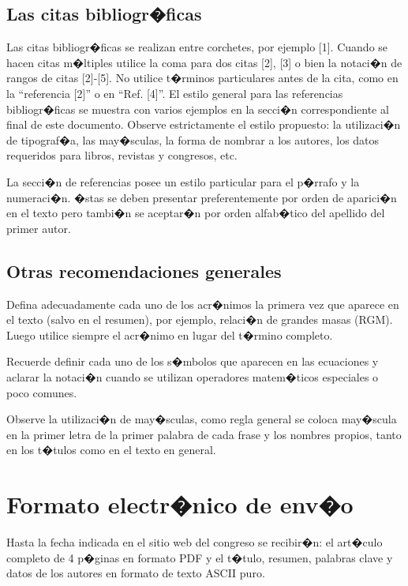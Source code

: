 \documentclass[conference,a4paper,10pt,oneside,final]{tfmpd}
\begin{document}
\subsection{Las citas bibliogr�ficas}

Las citas bibliogr�ficas se realizan entre corchetes, por ejemplo [1]. Cuando se hacen citas m�ltiples utilice la coma para dos citas [2], [3] o bien la notaci�n de rangos de citas [2]-[5]. No utilice t�rminos particulares antes de la cita, como en la ``referencia [2]'' o en ``Ref. [4]''. El estilo general para las referencias bibliogr�ficas se muestra con varios ejemplos en la secci�n correspondiente al final de este documento. Observe estrictamente el estilo propuesto: la utilizaci�n de tipograf�a, las may�sculas, la forma de nombrar a los autores, los datos requeridos para libros, revistas y congresos, etc.

La secci�n de referencias posee un estilo particular para el p�rrafo y la numeraci�n. �stas se deben presentar preferentemente por orden de aparici�n en el texto pero tambi�n se aceptar�n por orden alfab�tico del apellido del primer autor.

\subsection{Otras recomendaciones generales}

Defina adecuadamente cada uno de los acr�nimos la primera vez que aparece en el texto (salvo en el resumen), por ejemplo, relaci�n de grandes masas (RGM). Luego utilice siempre el acr�nimo en lugar del t�rmino completo.

Recuerde definir cada uno de los s�mbolos que aparecen en las ecuaciones y aclarar la notaci�n cuando se utilizan operadores matem�ticos especiales o poco comunes.

Observe la utilizaci�n de may�sculas, como regla general se coloca may�scula en la primer letra de la primer palabra de cada frase y los nombres propios, tanto en los t�tulos como en el texto en general.

\section{Formato electr�nico de env�o}

Hasta la fecha indicada en el sitio web del congreso se recibir�n: el art�culo completo de 4 p�ginas en formato PDF y el t�tulo, resumen, palabras clave y datos de los autores en formato de texto ASCII puro.
\end{document}
